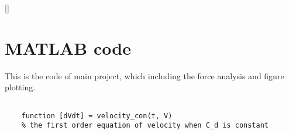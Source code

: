 \documentclass[main.tex]{subfiles}
\begin{document}
[]

\appendix
\section{MATLAB code}

This is the code of main project, which including the force analysis and figure plotting.

\begin{lstlisting}

    function [dVdt] = velocity_con(t, V)
    % the first order equation of velocity when C_d is constant

\end{lstlisting}
\end{document}
